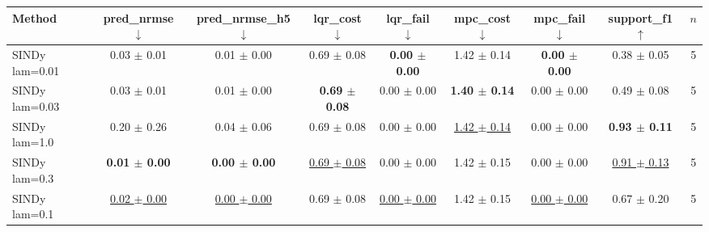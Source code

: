 \begin{tabular}{lcccccccc}
\toprule
Method & pred\_nrmse $\downarrow$ & pred\_nrmse\_h5 $\downarrow$ & lqr\_cost $\downarrow$ & lqr\_fail $\downarrow$ & mpc\_cost $\downarrow$ & mpc\_fail $\downarrow$ & support\_f1 $\uparrow$ & $n$ \\
\midrule
SINDy lam=0.01 & 0.03 $\pm$ 0.01 & 0.01 $\pm$ 0.00 & 0.69 $\pm$ 0.08 & \textbf{0.00 $\pm$ 0.00} & 1.42 $\pm$ 0.14 & \textbf{0.00 $\pm$ 0.00} & 0.38 $\pm$ 0.05 & 5 \\
SINDy lam=0.03 & 0.03 $\pm$ 0.01 & 0.01 $\pm$ 0.00 & \textbf{0.69 $\pm$ 0.08} & 0.00 $\pm$ 0.00 & \textbf{1.40 $\pm$ 0.14} & 0.00 $\pm$ 0.00 & 0.49 $\pm$ 0.08 & 5 \\
SINDy lam=1.0 & 0.20 $\pm$ 0.26 & 0.04 $\pm$ 0.06 & 0.69 $\pm$ 0.08 & 0.00 $\pm$ 0.00 & \underline{1.42 $\pm$ 0.14} & 0.00 $\pm$ 0.00 & \textbf{0.93 $\pm$ 0.11} & 5 \\
SINDy lam=0.3 & \textbf{0.01 $\pm$ 0.00} & \textbf{0.00 $\pm$ 0.00} & \underline{0.69 $\pm$ 0.08} & 0.00 $\pm$ 0.00 & 1.42 $\pm$ 0.15 & 0.00 $\pm$ 0.00 & \underline{0.91 $\pm$ 0.13} & 5 \\
SINDy lam=0.1 & \underline{0.02 $\pm$ 0.00} & \underline{0.00 $\pm$ 0.00} & 0.69 $\pm$ 0.08 & \underline{0.00 $\pm$ 0.00} & 1.42 $\pm$ 0.15 & \underline{0.00 $\pm$ 0.00} & 0.67 $\pm$ 0.20 & 5 \\
\bottomrule
\end{tabular}
